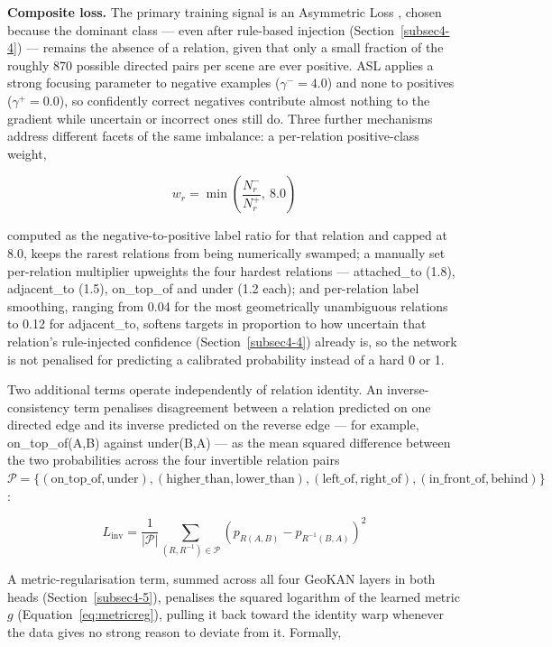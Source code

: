 \documentclass[sn-mathphys,Numbered]{sn-jnl}
\begin{document}
\textbf{Composite loss.} The primary training signal is an Asymmetric Loss \cite{ridnik2021asl}, chosen because the dominant class --- even after rule-based injection (Section~\ref{subsec4-4}) --- remains the absence of a relation, given that only a small fraction of the roughly 870 possible directed pairs per scene are ever positive. ASL applies a strong focusing parameter to negative examples ($\gamma^-=4.0$) and none to positives ($\gamma^+=0.0$), so confidently correct negatives contribute almost nothing to the gradient while uncertain or incorrect ones still do. Three further mechanisms address different facets of the same imbalance: a per-relation positive-class weight,

\begin{equation}
w_r = \min\!\left(\frac{N_r^-}{N_r^+},\ 8.0\right)
\label{eq:posweight}
\end{equation}

computed as the negative-to-positive label ratio for that relation and capped at 8.0, keeps the rarest relations from being numerically swamped; a manually set per-relation multiplier upweights the four hardest relations --- attached\_to (1.8), adjacent\_to (1.5), on\_top\_of and under (1.2 each); and per-relation label smoothing, ranging from 0.04 for the most geometrically unambiguous relations to 0.12 for adjacent\_to, softens targets in proportion to how uncertain that relation's rule-injected confidence (Section~\ref{subsec4-4}) already is, so the network is not penalised for predicting a calibrated probability instead of a hard 0 or 1.

Two additional terms operate independently of relation identity. An inverse-consistency term penalises disagreement between a relation predicted on one directed edge and its inverse predicted on the reverse edge --- for example, on\_top\_of(A,B) against under(B,A) --- as the mean squared difference between the two probabilities across the four invertible relation pairs $\mathcal{P} = \{(\text{on\_top\_of}, \text{under}), (\text{higher\_than}, \text{lower\_than}), (\text{left\_of}, \text{right\_of}), (\text{in\_front\_of}, \text{behind})\}$:

\begin{equation}
L_{\text{inv}} = \frac{1}{|\mathcal{P}|} \sum_{(R, R^{-1}) \in \mathcal{P}} \left(p_{R(A,B)} - p_{R^{-1}(B,A)}\right)^2
\label{eq:invloss}
\end{equation}

A metric-regularisation term, summed across all four GeoKAN layers in both heads (Section~\ref{subsec4-5}), penalises the squared logarithm of the learned metric $g$ (Equation~\ref{eq:metricreg}), pulling it back toward the identity warp whenever the data gives no strong reason to deviate from it. Formally,
\end{document}

